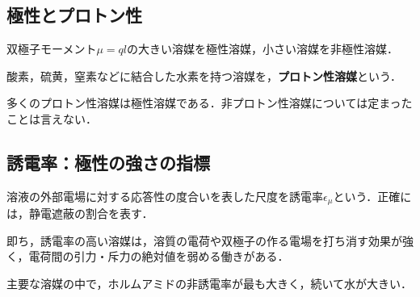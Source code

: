 \documentclass[uplatex, dvipdfmx]{jsreport}
\begin{document}
\subsection{極性とプロトン性}
\begin{definition}
    双極子モーメント$\mu=ql$の大きい溶媒を極性溶媒，小さい溶媒を非極性溶媒．
\end{definition}
\begin{definition}
    酸素，硫黄，窒素などに結合した水素を持つ溶媒を，\textbf{プロトン性溶媒}という．
\end{definition}
\begin{example}
    多くのプロトン性溶媒は極性溶媒である．非プロトン性溶媒については定まったことは言えない．
\end{example}

\subsection{誘電率：極性の強さの指標}
\begin{definition}
    溶液の外部電場に対する応答性の度合いを表した尺度を誘電率$\epsilon_\mu$という．正確には，静電遮蔽の割合を表す．

    即ち，誘電率の高い溶媒は，溶質の電荷や双極子の作る電場を打ち消す効果が強く，電荷間の引力・斥力の絶対値を弱める働きがある．
\end{definition}
\begin{example}
    主要な溶媒の中で，ホルムアミドの非誘電率が最も大きく，続いて水が大きい．
\end{example}
\end{document}
